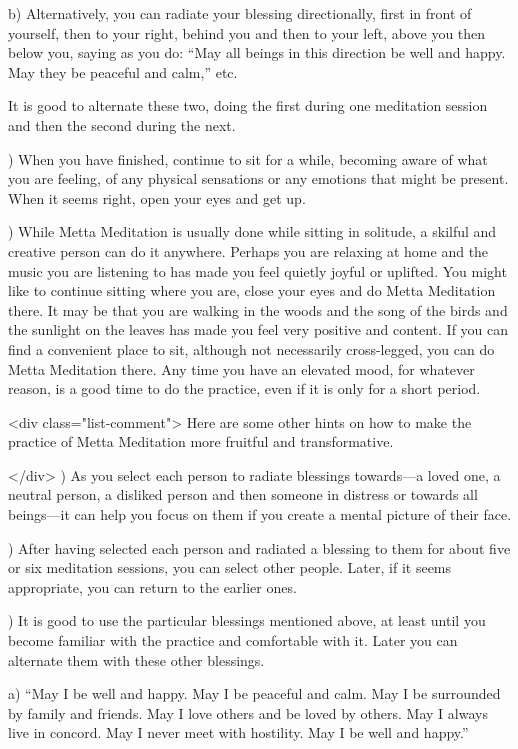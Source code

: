 \documentclass[10pt, openright]{book}
\begin{document}
b) Alternatively, you can radiate your blessing directionally, first in front of yourself, then to your right, behind you and then to your left, above you then below you, saying as you do: “May all beings in this direction be well and happy. May they be peaceful and calm,” etc.


It is good to alternate these two, doing the first during one meditation session and then the second during the next.


\vspace* {1em}) When you have finished, continue to sit for a while, becoming aware of what you are feeling, of any physical sensations or any emotions that might be present. When it seems right, open your eyes and get up.


\vspace* {1em}) While Metta Meditation is usually done while sitting in solitude, a skilful and creative person can do it anywhere. Perhaps you are relaxing at home and the music you are listening to has made you feel quietly joyful or uplifted. You might like to continue sitting where you are, close your eyes and do Metta Meditation there. It may be that you are walking in the woods and the song of the birds and the sunlight on the leaves has made you feel very positive and content. If you can find a convenient place to sit, although not necessarily cross-legged, you can do Metta Meditation there. Any time you have an elevated mood, for whatever reason, is a good time to do the practice, even if it is only for a short period.


<div class="list-comment">
Here are some other hints on how to make the practice of Metta Meditation more fruitful and transformative.


</div>
\vspace* {1em}) As you select each person to radiate blessings towards—a loved one, a neutral person, a disliked person and then someone in distress or towards all beings—it can help you focus on them if you create a mental picture of their face.


\vspace* {1em}) After having selected each person and radiated a blessing to them for about five or six meditation sessions, you can select other people. Later, if it seems appropriate, you can return to the earlier ones.


\vspace* {1em}) It is good to use the particular blessings mentioned above, at least until you become familiar with the practice and comfortable with it. Later you can alternate them with these other blessings.


a) “May I be well and happy. May I be peaceful and calm. May I be surrounded by family and friends. May I love others and be loved by others. May I always live in concord. May I never meet with hostility. May I be well and happy.”
\end{document}
